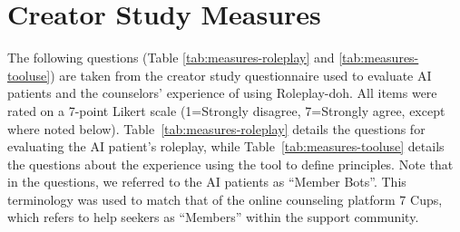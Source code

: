 \documentclass[11pt]{article}
\begin{document}
\section{Creator Study Measures}
\label{appendix:creatorstudy-measure}

The following questions (Table \ref{tab:measures-roleplay} and \ref{tab:measures-tooluse}) are taken from the creator study questionnaire used to evaluate AI patients and the counselors' experience of using Roleplay-doh.
All items were rated on a 7-point Likert scale (1=Strongly disagree, 7=Strongly agree, except where noted below).
Table~\ref{tab:measures-roleplay} details the questions for evaluating the AI patient's roleplay, while Table~\ref{tab:measures-tooluse} details the questions about the experience using the tool to define principles.
Note that in the questions, we referred to the AI patients as ``Member Bots''. This terminology was used to match that of the online counseling platform 7 Cups, which refers to help seekers as ``Members'' within the support community.

\begin{table}[!h]
    \centering
    \caption{Six measures used by creators to evaluate the two AI patients they created. Several measures were rephrased from prior work on evaluating Standardized Patients, or trained human actors, on case roleplay ability~\cite{himmelbauer2018standardized}.}
    \label{tab:measures-roleplay}
\end{table}
 
\end{document}
